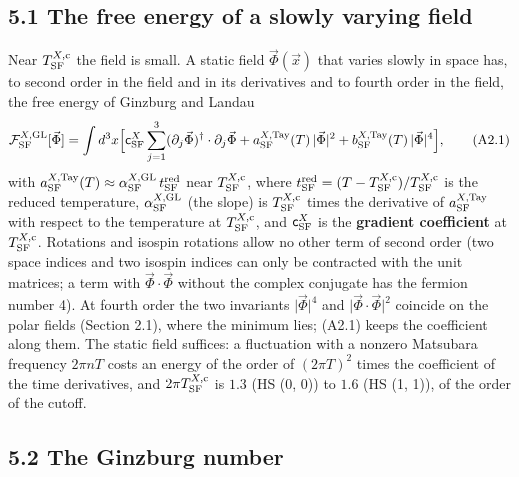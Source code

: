 \documentclass[
  10pt,
]{article}
\begin{document}
\hypertarget{the-free-energy-of-a-slowly-varying-field}{%
\subsection{5.1 The free energy of a slowly varying
field}\label{the-free-energy-of-a-slowly-varying-field}}

Near \(T^{X,{\rm c}}_{\rm SF}\) the field is small. A static field
\(\vec\Phi(\vec x)\) that varies slowly in space has, to second order in
the field and in its derivatives and to fourth order in the field, the
free energy of Ginzburg and Landau
\[\mathcal F^{X,{\rm GL}}_{\rm SF}[\vec\Phi]=\int d^3x\Big[\mathsf c^X_{\rm SF}\sum_{j=1}^3(\partial_j\vec\Phi)^\dagger\cdot\partial_j\vec\Phi+a^{X,{\rm Tay}}_{\rm SF}(T)\,\lvert\vec\Phi\rvert^2+b^{X,{\rm Tay}}_{\rm SF}(T)\,\lvert\vec\Phi\rvert^4\Big],\tag{A2.1}\]
with
\(a^{X,{\rm Tay}}_{\rm SF}(T)\approx\alpha^{X,{\rm GL}}_{\rm SF}\,t^{\rm red}_{\rm SF}\)
near \(T^{X,{\rm c}}_{\rm SF}\), where
\(t^{\rm red}_{\rm SF}=(T-T^{X,{\rm c}}_{\rm SF})/T^{X,{\rm c}}_{\rm SF}\)
is the reduced temperature, \(\alpha^{X,{\rm GL}}_{\rm SF}\) (the slope)
is \(T^{X,{\rm c}}_{\rm SF}\) times the derivative of
\(a^{X,{\rm Tay}}_{\rm SF}\) with respect to the temperature at
\(T^{X,{\rm c}}_{\rm SF}\), and \(\mathsf c^X_{\rm SF}\) is the
\textbf{gradient coefficient} at \(T^{X,{\rm c}}_{\rm SF}\). Rotations
and isospin rotations allow no other term of second order (two space
indices and two isospin indices can only be contracted with the unit
matrices; a term with \(\vec\Phi\cdot\vec\Phi\) without the complex
conjugate has the fermion number 4). At fourth order the two invariants
\(\lvert\vec\Phi\rvert^4\) and \(\lvert\vec\Phi\cdot\vec\Phi\rvert^2\)
coincide on the polar fields (Section 2.1), where the minimum lies;
(A2.1) keeps the coefficient along them. The static field suffices: a
fluctuation with a nonzero Matsubara frequency \(2\pi nT\) costs an
energy of the order of \((2\pi T)^2\) times the coefficient of the time
derivatives, and \(2\pi T^{X,{\rm c}}_{\rm SF}\) is \(1.3\) (HS (0, 0))
to \(1.6\) (HS (1, 1)), of the order of the cutoff.

\hypertarget{the-ginzburg-number}{%
\subsection{5.2 The Ginzburg number}\label{the-ginzburg-number}}
\end{document}

